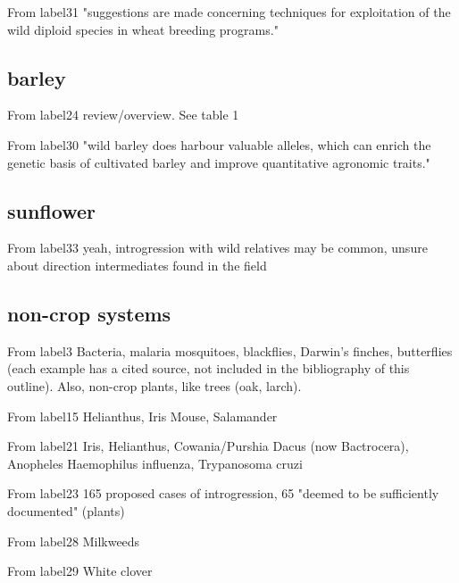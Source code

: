 \documentclass[11pt]{article}
\begin{document}
From {label31}
"suggestions are made concerning techniques for exploitation of the wild diploid species in wheat breeding programs."

\subsection*{barley}

From {label24}
review/overview.  See table 1

From {label30}
"wild barley does harbour valuable alleles, which can enrich the genetic basis of cultivated barley and improve quantitative agronomic traits."

\subsection*{sunflower}

From {label33}
yeah, introgression with wild relatives may be common, unsure about direction
intermediates found in the field

\subsection*{non-crop systems}
From {label3}
Bacteria, malaria mosquitoes, blackflies, Darwin's finches, butterflies (each example has a cited source, not included in the bibliography of this outline).
Also, non-crop plants, like trees (oak, larch).

From {label15}
Helianthus, Iris
Mouse, Salamander

From {label21}
Iris, Helianthus, Cowania/Purshia
Dacus (now Bactrocera), Anopheles
Haemophilus influenza, Trypanosoma cruzi

From {label23}
165 proposed cases of introgression, 65 "deemed to be sufficiently documented" (plants)

From {label28}
Milkweeds

From {label29}
White clover
\end{document}
